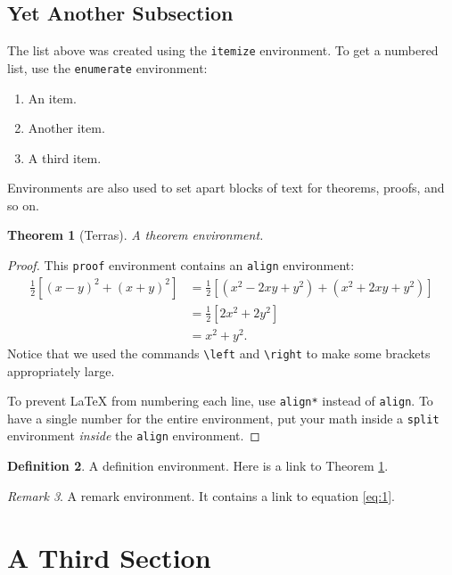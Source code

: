 \documentclass[a4paper,10pt,leqno]{article}
\numberwithin{equation}{section}
\theoremstyle{plain}
\newtheorem{thm}{Theorem}[section]
\theoremstyle{definition}
\newtheorem{df}[thm]{Definition}
\theoremstyle{remark}
\newtheorem{rem}[thm]{Remark}
\begin{document}
\subsection{Yet Another Subsection} 

The list above was created using the \texttt{itemize} environment.
To get a numbered list, use the \texttt{enumerate} environment:
\begin{enumerate}
\item 	An item.

\item 	Another item.

\item 	A third item.

\end{enumerate}
Environments are also used to set apart blocks of text for theorems, proofs, and so on.

\begin{thm}[Terras]\label{thm:1}
A theorem environment.
\end{thm}

\begin{proof}
This \texttt{proof} environment contains an \texttt{align} environment:
\begin{align}
\frac{1}{2} \left[(x - y)^2 + (x + y)^2 \right]
	&= \frac{1}{2} \left[(x^2 - 2xy + y^2) + (x^2 + 2xy + y^2) \right]\\
	&= \frac{1}{2} [2x^2 + 2y^2]\\
	&= x^2 + y^2.
\end{align}
Notice that we used the commands \texttt{\textbackslash{}left} and \texttt{\textbackslash{}right} to make some brackets appropriately large.

To prevent \LaTeX{} from numbering each line, use \texttt{align*} instead of \texttt{align}.
To have a single number for the entire environment, put your math inside a \texttt{split} environment \emph{inside} the \texttt{align} environment.
\end{proof}

\begin{df}
A definition environment.
Here is a link to Theorem \ref{thm:1}.
\end{df}

\begin{rem}
A remark environment.
It contains a link to equation \eqref{eq:1}.
\end{rem}

\section{A Third Section}
\end{document}
